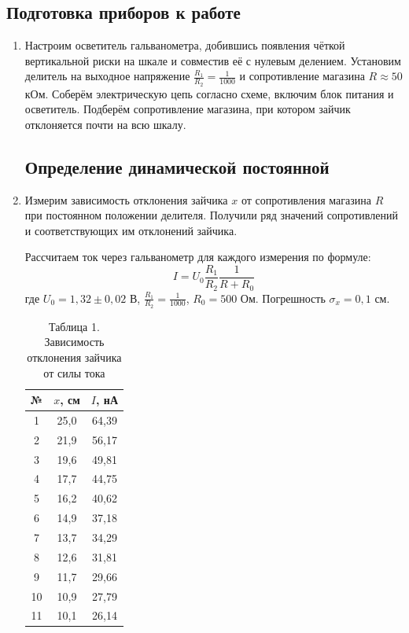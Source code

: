 \documentclass[a4paper]{article}
\begin{document}
\subsection*{Подготовка приборов к работе}
\begin{enumerate}
\item Настроим осветитель гальванометра, добившись появления чёткой вертикальной риски на шкале и совместив её с нулевым делением. Установим делитель на выходное напряжение $\frac{R_1}{R_2} = \frac{1}{1000}$ и сопротивление магазина $R \approx 50$ кОм. Соберём электрическую цепь согласно схеме, включим блок питания и осветитель. Подберём сопротивление магазина, при котором зайчик отклоняется почти на всю шкалу.

\subsection*{Определение динамической постоянной}

\item Измерим зависимость отклонения зайчика $x$ от сопротивления магазина $R$ при постоянном положении делителя. Получили ряд значений сопротивлений и соответствующих им отклонений зайчика. 

Рассчитаем ток через гальванометр для каждого измерения по формуле:
\[
I = U_0 \frac{R_1}{R_2} \frac{1}{R + R_0}
\]
где $U_0 = 1,32 \pm 0,02$ В, $\frac{R_1}{R_2} = \frac{1}{1000}$, $R_0 = 500$ Ом. Погрешность $\sigma_x = 0,1$ см.
\clearpage
\begin{table}[h!]
    \centering
    \begin{tabular}{|c|c|c|}
        \hline
        № & $x$, см & $I$, нА \\ \hline
        1 & 25,0 & 64,39 \\ \hline
        2 & 21,9 & 56,17 \\ \hline
        3 & 19,6 & 49,81 \\ \hline
        4 & 17,7 & 44,75 \\ \hline
        5 & 16,2 & 40,62 \\ \hline
        6 & 14,9 & 37,18 \\ \hline
        7 & 13,7 & 34,29 \\ \hline
        8 & 12,6 & 31,81 \\ \hline
        9 & 11,7 & 29,66 \\ \hline
        10 & 10,9 & 27,79 \\ \hline
        11 & 10,1 & 26,14 \\ \hline
    \end{tabular}
    \caption{Таблица 1. Зависимость отклонения зайчика от силы тока}
    \label{tab:current_deflection}
\end{table}


\end{enumerate}
\end{document}
